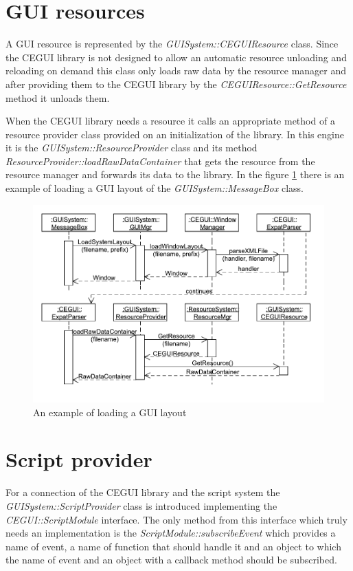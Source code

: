 \documentclass[a4paper, 12pt]{report}
\begin{document}
\section{GUI resources}
\label{sec:gui-resources}

A GUI resource is represented by the \emph{GUISystem::CEGUIResource} class. Since the CEGUI library is not designed to allow an automatic resource unloading and reloading on demand this class only loads raw data by the resource manager and after providing them to the CEGUI library by the \emph{CEGUIResource::GetResource} method it unloads them.

When the CEGUI library needs a resource it calls an appropriate method of a resource provider class provided on an initialization of the library. In this engine it is the \emph{GUISystem::ResourceProvider} class and its method \emph{ResourceProvider::loadRawDataContainer} that gets the resource from the resource manager and forwards its data to the library. In the figure \ref{fig:load-layout-sequence} there is an example of loading a GUI layout of the \emph{GUISystem::MessageBox} class.

\begin{figure}[htbp]
	\centering
		\includegraphics[width=1\textwidth]{LoadLayoutSequence.pdf}
	\caption{An example of loading a GUI layout}
	\label{fig:load-layout-sequence}
\end{figure}

\section{Script provider}
\label{sec:gui-script}

For a connection of the CEGUI library and the script system the \emph{GUISystem::ScriptProvider} class is introduced implementing the \emph{CEGUI::Script\-Module} interface. The only method from this interface which truly needs an implementation is the \emph{ScriptModule::subscribeEvent} which provides a name of event, a name of function that should handle it and an object to which the name of event and an object with a callback method should be subscribed.
\end{document}
